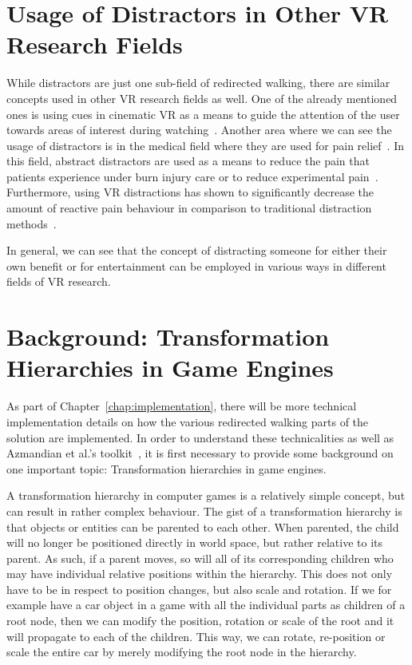 \section{Usage of Distractors in Other VR Research Fields}
While distractors are just one sub-field of redirected walking, there are similar concepts used in other VR research fields as well. One of the already mentioned ones is using cues in cinematic VR as a means to guide the attention of the user towards areas of interest during watching~\cite{nielsen2016missing}. Another area where we can see the usage of distractors is in the medical field where they are used for pain relief~\cite{malloy2010effectiveness, knight2018virtual}. In this field, abstract distractors are used as a means to reduce the pain that patients experience under burn injury care or to reduce experimental pain~\cite{malloy2010effectiveness}. Furthermore, using VR distractions has shown to significantly decrease the amount of reactive pain behaviour in comparison to traditional distraction methods~\cite{knight2018virtual}. 

In general, we can see that the concept of distracting someone for either their own benefit or for entertainment can be employed in various ways in different fields of VR research.

\section{Background: Transformation Hierarchies in Game Engines}
As part of Chapter~\ref{chap:implementation}, there will be more technical implementation details on how the various redirected walking parts of the solution are implemented. In order to understand these technicalities as well as Azmandian et al.'s toolkit~\cite{azmandian2016redirected}, it is first necessary to provide some background on one important topic: Transformation hierarchies in game engines.

A transformation hierarchy in computer games is a relatively simple concept, but can result in rather complex behaviour. The gist of a transformation hierarchy is that objects or entities can be parented to each other. When parented, the child will no longer be positioned directly in world space, but rather relative to its parent. As such, if a parent moves, so will all of its corresponding children who may have individual relative positions within the hierarchy. This does not only have to be in respect to position changes, but also scale and rotation. If we for example have a car object in a game with all the individual parts as children of a root node, then we can modify the position, rotation or scale of the root and it will propagate to each of the children. This way, we can rotate, re-position or scale the entire car by merely modifying the root node in the hierarchy.

